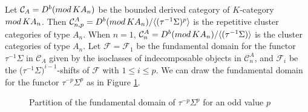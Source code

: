 \documentclass[a4paper,reqno,11pt]{amsart}
\theoremstyle{definition}
\def\C{\mathcal{C}}
\def\F{\mathcal{F}}
\renewcommand{\mod}{\mathop{\rm mod}\nolimits}%
\begin{document}
Let $\C_A=D^b(\mod KA_n)$ be the bounded derived category of $K$-category $\mod KA_n$. Then $\C_{n,p}^A=D^b(\mod KA_n)/\langle(\tau^{-1}\Sigma)^p\rangle$ is the repetitive cluster categories of type $A_n$. When $n=1$, $\C_{n}^A=D^b(\mod KA_n)/\langle(\tau^{-1}\Sigma)\rangle$ is the cluster categories of type $A_n$.
Let $\F=\F_1$ be the fundamental domain for the functor $\tau^{-1}\Sigma$ in $\C_A$ given by the isoclasses of indecomposable objects in $\C_n^A$, and $\F_i$ be the ($\tau^{-1}\Sigma)^{i-1}$-shifts of $\F$ with $1\leq i\leq p$. We can draw the fundamental domain for the functor $\tau^{-p}\Sigma^p$ as in Figure \ref{01}.
\begin{figure}[H]
\begin{center}
\end{center}
\caption{Partition of the fundamental domain of $\tau^{-p}\Sigma^p$ for an odd value $p$}
\label{01}
\end{figure}
\end{document}
